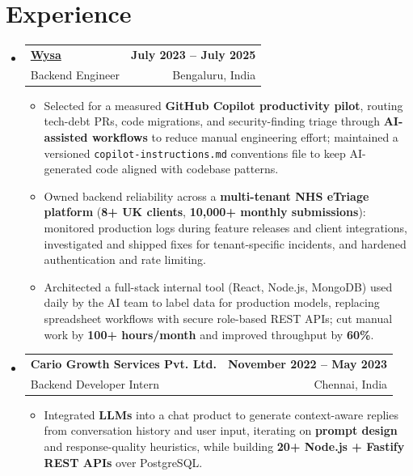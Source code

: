 \documentclass[letterpaper,10pt]{article}
\makeatletter
\newcommand{\resumeItem}[1]{
  \item\small{#1\vspace{-1pt}}
}
\newcommand{\resumeSubheading}[4]{
  \vspace{1pt}\item
    \begin{tabular*}{0.985\textwidth}[t]{l@{\extracolsep{\fill}}r}
      \textbf{#1} & \textbf{\small #2} \\
      {\small\color{ResumeSlate} #3} & {\small\color{ResumeSlate} #4} \\
    \end{tabular*}\vspace{-6pt}
}
\newcommand{\resumeSubHeadingListStart}{\begin{itemize}[leftmargin=0.0in, label={}, itemsep=2pt, topsep=2pt]}
\newcommand{\resumeSubHeadingListEnd}{\end{itemize}}
\newcommand{\resumeItemListStart}{\begin{itemize}[leftmargin=0.18in, itemsep=2pt, topsep=1pt]}
\newcommand{\resumeItemListEnd}{\end{itemize}\vspace{-4pt}}
\makeatother
\begin{document}
\section{Experience}
\resumeSubHeadingListStart
  \resumeSubheading
    {\href{https://www.wysa.io}{Wysa}}{July 2023 -- July 2025}
    {Backend Engineer}{Bengaluru, India}
    \resumeItemListStart
      \resumeItem{Selected for a measured \textbf{GitHub Copilot productivity pilot}, routing tech-debt PRs, code migrations, and security-finding triage through \textbf{AI-assisted workflows} to reduce manual engineering effort; maintained a versioned \texttt{copilot-instructions.md} conventions file to keep AI-generated code aligned with codebase patterns.}
      \resumeItem{Owned backend reliability across a \textbf{multi-tenant NHS eTriage platform} (\textbf{8+ UK clients}, \textbf{10{,}000+ monthly submissions}): monitored production logs during feature releases and client integrations, investigated and shipped fixes for tenant-specific incidents, and hardened authentication and rate limiting.}
      \resumeItem{Architected a full-stack internal tool (React, Node.js, MongoDB) used daily by the AI team to label data for production models, replacing spreadsheet workflows with secure role-based REST APIs; cut manual work by \textbf{100+ hours/month} and improved throughput by \textbf{60\%}.}
    \resumeItemListEnd
  \resumeSubheading
    {Cario Growth Services Pvt. Ltd.}{November 2022 -- May 2023}
    {Backend Developer Intern}{Chennai, India}
    \resumeItemListStart
      \resumeItem{Integrated \textbf{LLMs} into a chat product to generate context-aware replies from conversation history and user input, iterating on \textbf{prompt design} and response-quality heuristics, while building \textbf{20+ Node.js + Fastify REST APIs} over PostgreSQL.}
    \resumeItemListEnd
\resumeSubHeadingListEnd
\vspace{-4pt}
\end{document}
